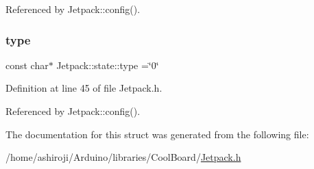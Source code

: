Referenced by Jetpack\+::config().

\mbox{\label{structJetpack_1_1state_a59e307555493f5a64f87ac4c63943371}} 
\subsubsection{\texorpdfstring{type}{type}}
{\footnotesize\ttfamily const char$\ast$ Jetpack\+::state\+::type =\char`\"{}0\char`\"{}}



Definition at line 45 of file Jetpack.\+h.



Referenced by Jetpack\+::config().



The documentation for this struct was generated from the following file\+:\begin{DoxyCompactItemize}
\item 
/home/ashiroji/\+Arduino/libraries/\+Cool\+Board/\hyperlink{Jetpack_8h}{Jetpack.\+h}\end{DoxyCompactItemize}
